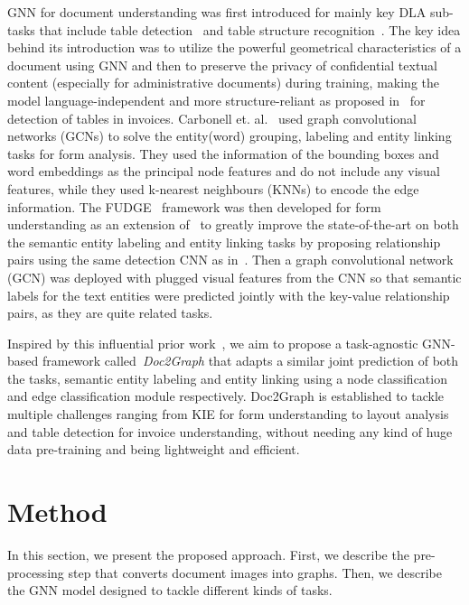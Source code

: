 \documentclass[runningheads]{llncs}
\begin{document}
GNN for document understanding was first introduced for mainly key DLA sub-tasks that include table detection~\cite{riba2019table} and table structure recognition~\cite{qasim2019rethinking}. The key idea behind its introduction was to utilize the powerful geometrical characteristics of a document using GNN and then to preserve the privacy of confidential textual content (especially for administrative documents) during training, making the model language-independent and more structure-reliant as proposed in~\cite{riba2019table} for detection of tables in invoices. Carbonell et. al.~\cite{carbonell2021named} used graph convolutional networks (GCNs) to solve the entity(word) grouping, labeling and entity linking tasks for form analysis. They used the information of the bounding
boxes and word embeddings as the principal node features and do not include any visual features, while they used k-nearest neighbours (KNNs) to encode the edge information. The FUDGE~\cite{davis2021visual} framework was then developed for form understanding as an extension of~\cite{davis2019deep} to greatly improve the state-of-the-art on both the semantic entity labeling and entity linking tasks by proposing relationship pairs using the same detection CNN as in~\cite{davis2019deep}. Then a graph convolutional network (GCN) was deployed with plugged visual features from the CNN so that semantic labels for the text entities were predicted jointly with the key-value relationship pairs, as they are quite related tasks. 

Inspired by this influential prior work~\cite{davis2021visual}, we aim to propose a task-agnostic GNN-based framework called~\emph{Doc2Graph} that adapts a similar joint prediction of both the tasks, semantic entity labeling and entity linking using a node classification and edge classification module respectively. Doc2Graph is established to tackle multiple challenges ranging from KIE for form understanding to layout analysis and table detection for invoice understanding, without needing any kind of huge data pre-training and being lightweight and efficient.
 
\section{Method}\label{s:method}
In this section, we present the proposed approach. First, we describe the pre-processing step that converts document images into graphs. Then, we describe the GNN model designed to tackle different kinds of tasks.
\end{document}

